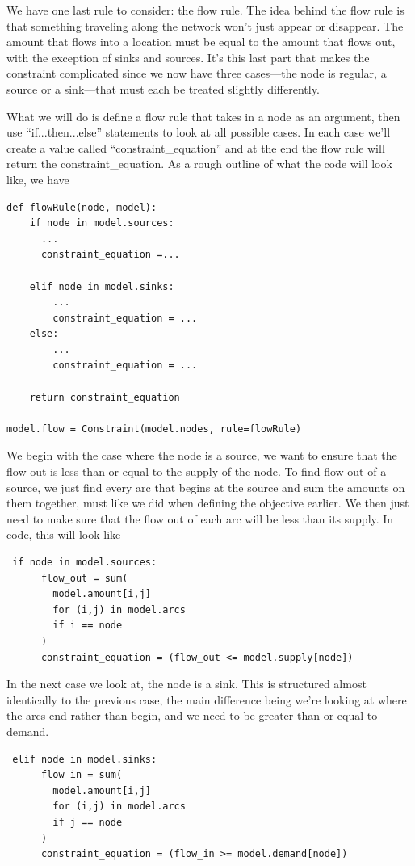 \documentclass{article}
\begin{document}
We have one last rule to consider: the flow rule.  The idea behind the flow rule is that something traveling along the network won't just appear or disappear.  The amount that flows into a location must be equal to the amount that flows out, with the exception of sinks and sources.  It's this last part that makes the constraint complicated since we now have three cases---the node is regular, a source or a sink---that must each be treated slightly differently.

What we will do is define a flow rule that takes in a node as an argument, then use ``if...then...else'' statements to look at all possible cases.  In each case we'll create a value called ``constraint\_equation'' and at the end the flow rule will return the constraint\_equation.  As a rough outline of what the code will look like, we have

\begin{verbatim}
def flowRule(node, model):
    if node in model.sources:
      ...
      constraint_equation =...
    
    elif node in model.sinks:
        ...
        constraint_equation = ...
    else:
        ...
        constraint_equation = ...
    
    return constraint_equation

model.flow = Constraint(model.nodes, rule=flowRule)
\end{verbatim}


We begin with the case where the node is a source, we want to ensure that the flow out is less than or equal to the supply of the node.  To find flow out of a source, we just find every arc that begins at the source and sum the amounts on them together, must like we did when defining the objective earlier.  We then just need to make sure that the flow out of each arc will be less than its supply.  In code, this will look like

\begin{verbatim}
 if node in model.sources:
      flow_out = sum(
        model.amount[i,j] 
        for (i,j) in model.arcs 
        if i == node
      )
      constraint_equation = (flow_out <= model.supply[node])
\end{verbatim}

In the next case we look at, the node is a sink.  This is structured almost identically to the previous case, the main difference being we're looking at where the arcs end rather than begin, and we need to be greater than or equal to demand.

\begin{verbatim}
 elif node in model.sinks:
      flow_in = sum(
        model.amount[i,j]
        for (i,j) in model.arcs
        if j == node
      )
      constraint_equation = (flow_in >= model.demand[node])
\end{verbatim}
\end{document}

